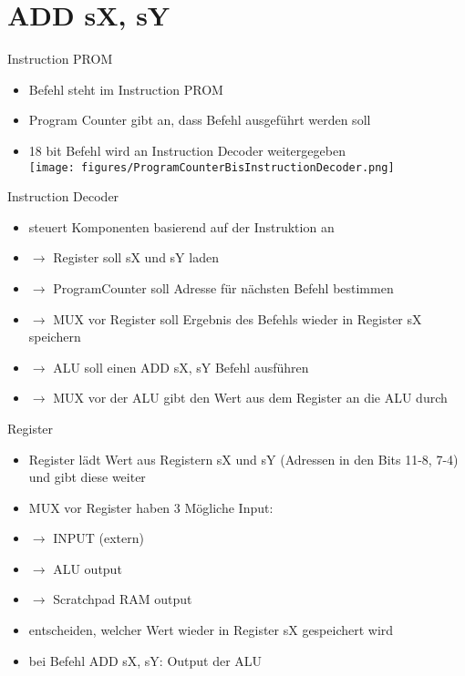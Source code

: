 \documentclass[10pt, t,
aspectratio=169,%
usenames,
dvipsnames,
]{beamer}
\begin{document}
	\section{ADD sX, sY}
	\begin{frame}{Instruction PROM}
		\begin{itemize}
			\item Befehl steht im Instruction PROM
			\item Program Counter gibt an, dass Befehl ausgeführt werden soll
			\item 18 bit Befehl wird an Instruction Decoder weitergegeben
			\\
			\texttt{[image: figures/ProgramCounterBisInstructionDecoder.png]}
		\end{itemize}
	\end{frame}
	\begin{frame}{Instruction Decoder}
		\begin{itemize}
			\item steuert Komponenten basierend auf der Instruktion an
			\item $\rightarrow$ Register soll sX und sY laden\\
			\item $\rightarrow$ ProgramCounter soll Adresse für nächsten Befehl bestimmen\\
			\item $\rightarrow$ MUX vor Register soll Ergebnis des Befehls wieder in Register sX speichern\\
			\item $\rightarrow$ ALU soll einen ADD sX, sY Befehl ausführen\\
			\item $\rightarrow$ MUX vor der ALU gibt den Wert aus dem Register an die ALU durch\\
		\end{itemize}
	\end{frame}
	\begin{frame}{Register}
		\begin{itemize}
			\item Register lädt Wert aus Registern sX und sY (Adressen in den Bits 11-8, 7-4) und gibt diese weiter
			\item MUX vor Register haben 3 Mögliche Input: \\
			\item $\rightarrow$ INPUT (extern) \\
			\item $\rightarrow$ ALU output \\
			\item $\rightarrow$ Scratchpad RAM output \\
			\item entscheiden, welcher Wert wieder in Register sX gespeichert wird
			\item bei Befehl ADD sX, sY: Output der ALU
			
		\end{itemize}
	\end{frame}
\end{document}
